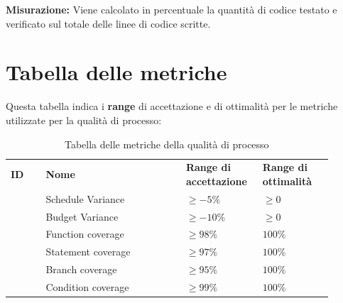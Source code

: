 \documentclass[PianoDiQualifica.tex]{subfiles}
\begin{document}
\textbf{Misurazione:}
Viene calcolato in percentuale la quantità di codice testato e verificato sul totale delle linee di codice scritte.



\section{Tabella delle metriche}
Questa tabella indica i \textbf{range} di accettazione e di ottimalità per le metriche utilizzate per la qualità di processo:
\begin{table}[H]
	\begin{center}
		\begin{tabu} to 
			\tableHeaderStyle
			
			\textbf{ID} & \textbf{Nome} & \textbf{Range di accettazione} & \textbf{Range di ottimalità}\\
			 & Schedule Variance & $ \geq -5\% $ & $ \geq 0 $ \\
			 & Budget Variance & $ \geq -10\% $ & $ \geq 0 $ \\
			 & Function coverage & $ \geq 98\% $ & $ 100\% $\\
			 & Statement coverage &  $ \geq 97\% $& $ 100\% $\\
			 & Branch coverage & $ \geq 95\% $ & $ 100\% $\\
			 & Condition coverage & $ \geq 99\% $ & $ 100\% $\\ %


		\end{tabu}
		\caption{Tabella delle metriche della qualità di processo}
		\vspace{-1em}
	\end{center}
\end{table}
\end{document}
